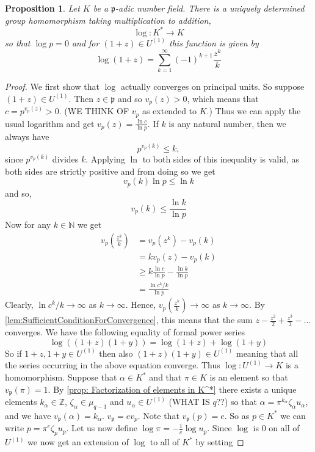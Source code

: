 \documentclass{article}
\newtheorem{proposition}{Proposition}[section]
\newcommand{\mfrak}[1]{\mathfrak{#1}}
\newcommand{\mbb}[1]{\mathbb{#1}}
\begin{document}
\begin{proposition}
    Let $K$ be a $\mfrak{p}$-adic number field. There is a uniquely determined group homomorphism taking multiplication to addition,
    $$\log : K^* \to K$$
    so that $\log p = 0$ and for $(1 + z) \in U^{(1)}$ this function is given by
    $$\log (1 + z) = \sum_{k = 1}^\infty (-1)^{k+1}\frac{z^k}{k}$$    
\end{proposition}
\begin{proof}
    We first show that $\log$ actually converges on principal units. So suppose $(1 + z) \in U^{(1)}$. Then $z \in \mfrak p$ and so $v_p(z) > 0$, which means that $c = p^{v_p(z)} > 0$. (WE THINK OF $v_p$ as extended to $K$.) Thus we can apply the usual logarithm and get $v_p(z) = \frac{\ln c}{\ln p}$. If $k$ is any natural number, then we always have $$p^{v_p(k)} \leq k,$$ since $p^{v_p(k)}$ divides $k$. Applying $\ln$ to both sides of this inequality is valid, as both sides are strictly positive and from doing so we get 
    $$v_p(k) \ln p \leq \ln k$$
    and so,
    $$v_p(k) \leq \frac{\ln k}{\ln p}$$
    Now for any $k \in \mbb N$ we get
    \begin{align*}
        v_p(\frac{z^k}{k}) &= v_p(z^k) - v_p(k)  \\
        &= kv_p(z) - v_p(k) \\
        &\geq k \frac{\ln c}{\ln p} - \frac{\ln k}{\ln p} \\
        &= \frac{\ln c^k / k}{\ln p}
    \end{align*}
    Clearly, $\ln c^k / k \to \infty$ as $k \to \infty$. Hence, $v_p(\frac{z^k}{k}) \to \infty$ as $k \to \infty$. By \cref{lem:SufficientConditionForConvergence}, this means that the sum $z - \frac{z^2}{2} + \frac{z^3}{3} - ...$ converges. We have the following equality of formal power series
    $$\log((1+z)(1+y)) = \log(1+z) + \log(1+y)$$
    So if $1+z, 1+y \in U^{(1)}$ then also $(1+z)(1+y) \in U^{(1)}$ meaning that all the series occurring in the above equation converge. Thus $\log : U^{(1)} \to K$ is a homomorphism. Suppose that $\alpha \in K^*$ and that $\pi \in K$ is an element so that $v_\mfrak p(\pi) = 1$. By \cref{prop: Factorization of elements in K^*} there exists a unique elements $k_\alpha \in \mbb Z$, $\zeta_\alpha \in \mu_{q-1}$ and $u_\alpha \in U^{(1)}$ (WHAT IS $q$??) so that $\alpha = \pi^{k_\alpha} \zeta_\alpha u_\alpha$, and we have $v_\mfrak p(\alpha) = k_\alpha$. 
    $v_\mfrak p = e v_p$. Note that $v_{\mfrak p} (p) = e$. So as $p \in K^*$ we can write $p = \pi^{e}\zeta_p u_p$. Let us now define $\log \pi = -\frac{1}{e}\log u_p$. Since $\log$ is 0 on all of $U^{(1)}$ we now get an extension of $\log$ to all of $K^*$ by setting

\end{proof}
\end{document}
